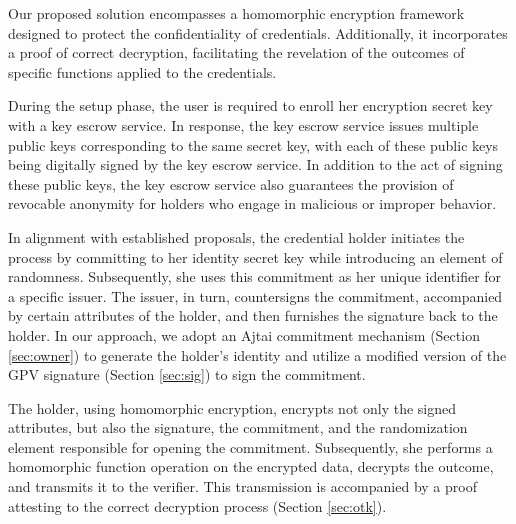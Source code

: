 Our proposed solution encompasses a homomorphic encryption framework designed to protect the confidentiality of credentials. Additionally, it incorporates a proof of correct decryption, facilitating the revelation of the outcomes of specific functions applied to the credentials.

During the setup phase, the user is required to enroll her encryption secret key with a key escrow service. In response, the key escrow service issues multiple public keys corresponding to the same secret key, with each of these public keys being digitally signed by the key escrow service. In addition to the act of signing these public keys, the key escrow service also guarantees the provision of revocable anonymity for holders who engage in malicious or improper behavior.

In alignment with established proposals, the credential holder initiates the process by committing to her identity secret key while introducing an element of randomness. Subsequently, she uses this commitment as her unique identifier for a specific issuer. The issuer, in turn, countersigns the commitment, accompanied by certain attributes of the holder, and then furnishes the signature back to the holder. In our approach, we adopt an Ajtai commitment mechanism \cite{ajtaiGeneratingHardInstances1999} (Section \ref{sec:owner}) to generate the holder's identity and utilize a modified version of the GPV signature \cite{gentryTrapdoorsHardLattices2008} (Section \ref{sec:sig}) to sign the commitment.

The holder, using homomorphic encryption, encrypts not only the signed attributes, but also the signature, the commitment, and the randomization element responsible for opening the commitment. Subsequently, she performs a homomorphic function operation on the encrypted data, decrypts the outcome, and transmits it to the verifier. This transmission is accompanied by a proof attesting to the correct decryption process \cite{chillottiHomomorphicLWEBased2016} (Section \ref{sec:otk}).



